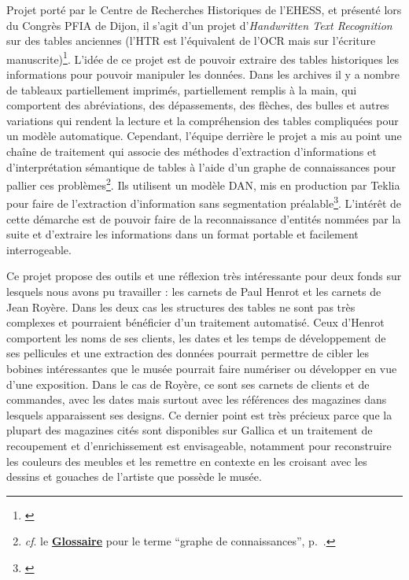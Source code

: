 Projet porté par le Centre de Recherches Historiques de l'EHESS, et présenté lors du Congrès PFIA de Dijon, il s'agit d'un projet d'\textit{Handwritten Text Recognition} sur des tables anciennes (l'HTR est l'équivalent de l'OCR mais sur l'écriture manuscrite)\footnote{\cite{tual_extraction_2025}}. L'idée de ce projet est de pouvoir extraire des tables historiques les informations pour pouvoir manipuler les données. Dans les archives il y a nombre de tableaux partiellement imprimés, partiellement remplis à la main, qui comportent des abréviations, des dépassements, des flèches, des bulles et autres variations qui rendent la lecture et la compréhension des tables compliquées pour un modèle automatique. Cependant, l'équipe derrière le projet a mis au point une chaîne de traitement qui associe des méthodes d'extraction d'informations et d'interprétation sémantique de tables à l'aide d'un graphe de connaissances pour pallier ces problèmes\footnote{\textit{cf}. le \textbf{\hyperref[sec:Glossaire]{Glossaire}} pour le terme \enquote{graphe de connaissances}, p.~\pageref{sec:Glossaire}.}. Ils utilisent un modèle DAN, mis en production par Teklia pour faire de l'extraction d'information sans segmentation préalable\footnote{\cite{noauthor_dan_nodate}}. L'intérêt de cette démarche est de pouvoir faire de la reconnaissance d'entités nommées par la suite et d'extraire les informations dans un format portable et facilement interrogeable.

Ce projet propose des outils et une réflexion très intéressante pour deux fonds sur lesquels nous avons pu travailler : les carnets de Paul Henrot et les carnets de Jean Royère. Dans les deux cas les structures des tables ne sont pas très complexes et pourraient bénéficier d'un traitement automatisé. Ceux d'Henrot comportent les noms de ses clients, les dates et les temps de développement de ses pellicules et une extraction des données pourrait permettre de cibler les bobines intéressantes que le musée pourrait faire numériser ou développer en vue d'une exposition. Dans le cas de Royère, ce sont ses carnets de clients et de commandes, avec les dates mais surtout avec les références des magazines dans lesquels apparaissent ses designs. Ce dernier point est très précieux parce que la plupart des magazines cités sont disponibles sur Gallica et un traitement de recoupement et d'enrichissement est envisageable, notamment pour reconstruire les couleurs des meubles et les remettre en contexte en les croisant avec les dessins et gouaches de l'artiste que possède le musée. 

